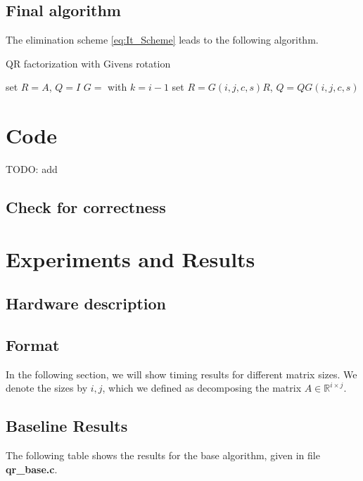 \documentclass[a4paper]{scrartcl}
\begin{document}
    \subsection{Final algorithm}
        The elimination scheme \ref{eq:It_Scheme} leads to the following
        algorithm.
        \begin{algorithm}[H]
            \caption{QR factorization with Givens rotation}\label{alg:QR_Givens}
            \begin{algorithmic}[1]
            \State set $R=A$, $Q=I$
                    \State $G =$  with $k=i-1$
                    \State set $R=G(i,j,c,s) R$, $Q = Q G(i,j,c,s)$
                \EndFor
            \EndFor
            \EndProcedure
            \end{algorithmic}
        \end{algorithm}


\section{Code}
    TODO: add
    \subsection{Check for correctness}

\section{Experiments and Results}

    \subsection{Hardware description}

    \subsection{Format}
        In the following section, we will show timing results for different
        matrix sizes. We denote the sizes by $i,j$, which we defined as
        decomposing the matrix $A \in \mathbb{R}^{i\times j}$.

    \subsection{Baseline Results}
        The following table shows the results for the base algorithm, given in
        file \textbf{qr\_base.c}.\\
        
\end{document}
